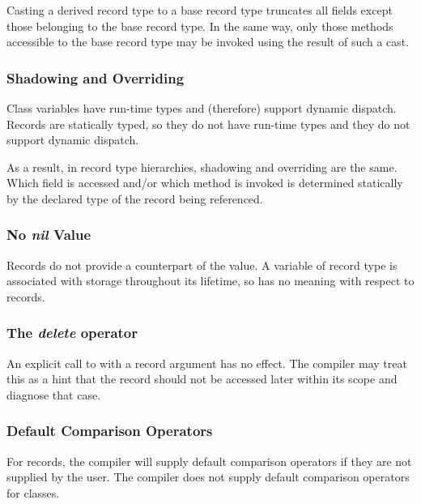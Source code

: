 Casting a derived record type to a base record type truncates all 
fields except those belonging to the base record type.  In the same way, only
those methods accessible to the base record type may be invoked using the result
of such a cast.

\subsubsection{Shadowing and Overriding}
\label{Base_Method_Differences}

Class variables have run-time types and (therefore) support dynamic dispatch.
Records are statically typed, so they do not have run-time types and they do not
support dynamic dispatch.

As a result, in record type hierarchies, shadowing and overriding are the same.  
Which field is accessed
and/or which method is invoked is determined statically by the declared type of
the record being referenced.

\subsubsection{No {\em nil} Value}

Records do not provide a counterpart of the  value.  A variable of
record type is associated with storage throughout its lifetime, so 
has no meaning with respect to records.

\subsubsection{The {\em delete} operator}

An explicit call to  with a record argument has no effect.  The
compiler may treat this as a hint that the record should not be accessed later
within its scope and diagnose that case.

\subsubsection{Default Comparison Operators}
\label{Comparison_Operator_Differences}

For records, the compiler will supply default comparison operators if they are
not supplied by the user.  The compiler does not supply default comparison
operators for classes.

